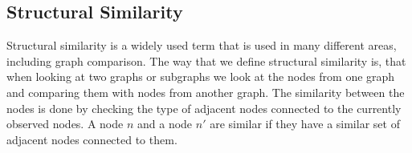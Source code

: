 \subsection{Structural Similarity}
\label{Subsec:structural_similarity}
Structural similarity is a widely used term that is used in many different areas, including graph comparison. The way that we define structural similarity is, that when looking at two graphs or subgraphs we look at the nodes from one graph and comparing them with nodes from another graph. The similarity between the nodes is done by checking the type of adjacent nodes connected to the currently observed nodes. 
A node $n$ and a node $n'$ are similar if they have a similar set of adjacent nodes connected to them.
